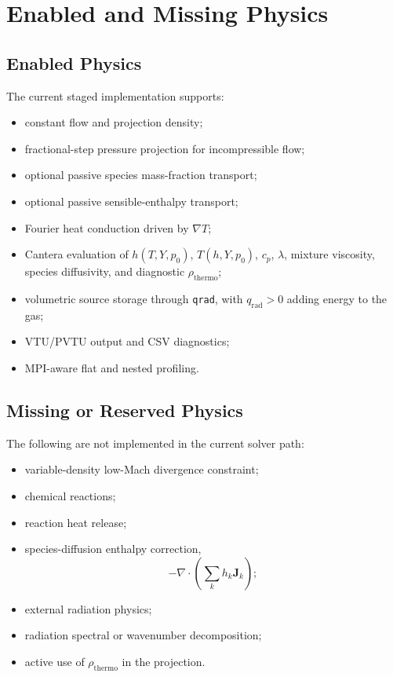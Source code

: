 \documentclass[11pt]{article}
\begin{document}
\section{Enabled and Missing Physics}

\subsection{Enabled Physics}

The current staged implementation supports:
\begin{itemize}[leftmargin=*]
  \item constant flow and projection density;
  \item fractional-step pressure projection for incompressible flow;
  \item optional passive species mass-fraction transport;
  \item optional passive sensible-enthalpy transport;
  \item Fourier heat conduction driven by \(\nabla T\);
  \item Cantera evaluation of \(h(T,Y,p_0)\), \(T(h,Y,p_0)\), \(c_p\),
        \(\lambda\), mixture viscosity, species diffusivity, and diagnostic
        \(\rho_{\mathrm{thermo}}\);
  \item volumetric source storage through \texttt{qrad}, with
        \(q_{\mathrm{rad}}>0\) adding energy to the gas;
  \item VTU/PVTU output and CSV diagnostics;
  \item MPI-aware flat and nested profiling.
\end{itemize}

\subsection{Missing or Reserved Physics}

The following are not implemented in the current solver path:
\begin{itemize}[leftmargin=*]
  \item variable-density low-Mach divergence constraint;
  \item chemical reactions;
  \item reaction heat release;
  \item species-diffusion enthalpy correction,
        \[
          -\nabla \cdot \left(\sum_k h_k \mathbf{J}_k\right);
        \]
  \item external radiation physics;
  \item radiation spectral or wavenumber decomposition;
  \item active use of \(\rho_{\mathrm{thermo}}\) in the projection.
\end{itemize}
\end{document}
